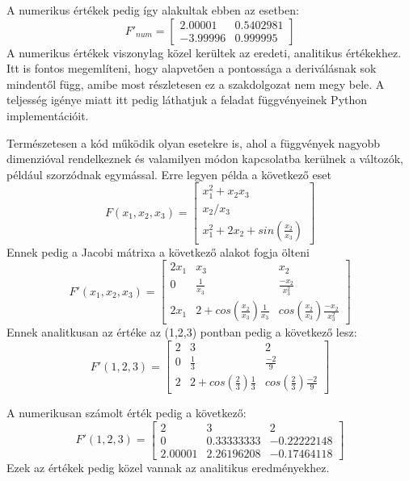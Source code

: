 \documentclass{article}
\theoremstyle{definition}
\theoremstyle{theorem}
\begin{document}
A numerikus értékek pedig így alakultak ebben az esetben:
\begin{equation*}
    F'_{num} = \begin{bmatrix}
        2.00001 & 0.5402981 \\
        -3.99996 & 0.999995
    \end{bmatrix}
\end{equation*}
A numerikus értékek viszonylag közel kerültek az eredeti, analitikus értékekhez.
Itt is fontos megemlíteni, hogy alapvetően a pontossága a deriválásnak sok mindentől függ, amibe most részletesen ez a szakdolgozat nem megy bele. A teljesség igénye miatt itt pedig láthatjuk a feladat függvényeinek Python implementációit.

Természetesen a kód működik olyan esetekre is, ahol a függvények nagyobb dimenzióval rendelkeznek és valamilyen módon kapcsolatba kerülnek a változók, például szorzódnak egymással. Erre legyen példa a következő eset
\begin{equation*}
    F(x_1,x_2,x_3) = \begin{bmatrix}
        x_1 ^ 2 + x_2 x_3 \\
        x_2/x_3 \\
        x_1 ^2 + 2 x_2 + sin(\frac{x_2}{x_3})
    \end{bmatrix}
\end{equation*}
 Ennek pedig a Jacobi mátrixa a következő alakot fogja ölteni
 \begin{equation*}
     F'(x_1, x_2, x_3) = \begin{bmatrix}
         2 x_1 & x_3 & x_2 \\
         0 & \frac{1}{x_3} & \frac{-x_2}{x_3^2} \\
         2 x_1 & 2 + cos(\frac{x_2}{x_3}) \frac{1}{x_3} & cos(\frac{x_2}{x_3}) \frac{-x_2}{x_3^2}
     \end{bmatrix}
 \end{equation*}
 Ennek analitkusan az értéke az (1,2,3) pontban pedig a következő lesz:
  \begin{equation*}
     F'(1, 2, 3) = \begin{bmatrix}
         2  & 3 & 2 \\
         0 & \frac{1}{3} & \frac{-2}{9} \\
         2  & 2 + cos(\frac{2}{3}) \frac{1}{3}& cos(\frac{2}{3}) \frac{-2}{9}
     \end{bmatrix}
 \end{equation*}

 A numerikusan számolt érték pedig a következő:
\begin{equation*}
     F'(1, 2, 3) = \begin{bmatrix}
         2  & 3 & 2 \\
         0 & 0.33333333 & -0.22222148 \\
         2.00001  & 2.26196208 & -0.17464118
     \end{bmatrix}
\end{equation*}
Ezek az értékek pedig közel vannak az analitikus eredményekhez.
\end{document}
